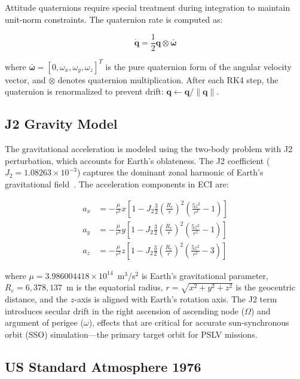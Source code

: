 \documentclass[conference]{IEEEtran}
\newcommand{\vect}[1]{\boldsymbol{#1}}
\begin{document}
Attitude quaternions require special treatment during integration to maintain unit-norm constraints. The quaternion rate is computed as:

\begin{equation}
    \dot{\vect{q}} = \frac{1}{2} \vect{q} \otimes \bar{\vect{\omega}}
    \label{eq:quat_rate}
\end{equation}

\noindent where $\bar{\vect{\omega}} = [0, \omega_x, \omega_y, \omega_z]^T$ is the pure quaternion form of the angular velocity vector, and $\otimes$ denotes quaternion multiplication. After each RK4 step, the quaternion is renormalized to prevent drift: $\vect{q} \leftarrow \vect{q} / \|\vect{q}\|$.

\subsection{J2 Gravity Model}
\label{sec:j2}

The gravitational acceleration is modeled using the two-body problem with J2 perturbation, which accounts for Earth's oblateness. The J2 coefficient ($J_2 = 1.08263 \times 10^{-3}$) captures the dominant zonal harmonic of Earth's gravitational field~\cite{vallado2013fundamentals}. The acceleration components in ECI are:

\begin{align}
    a_x &= -\frac{\mu}{r^3} x \left[1 - J_2 \frac{3}{2}\left(\frac{R_e}{r}\right)^2 \left(\frac{5z^2}{r^2} - 1\right)\right] \label{eq:j2_x} \\
    a_y &= -\frac{\mu}{r^3} y \left[1 - J_2 \frac{3}{2}\left(\frac{R_e}{r}\right)^2 \left(\frac{5z^2}{r^2} - 1\right)\right] \label{eq:j2_y} \\
    a_z &= -\frac{\mu}{r^3} z \left[1 - J_2 \frac{3}{2}\left(\frac{R_e}{r}\right)^2 \left(\frac{5z^2}{r^2} - 3\right)\right] \label{eq:j2_z}
\end{align}

\noindent where $\mu = 3.986004418 \times 10^{14}$~m$^3$/s$^2$ is Earth's gravitational parameter, $R_e = 6{,}378{,}137$~m is the equatorial radius, $r = \sqrt{x^2 + y^2 + z^2}$ is the geocentric distance, and the $z$-axis is aligned with Earth's rotation axis. The J2 term introduces secular drift in the right ascension of ascending node ($\Omega$) and argument of perigee ($\omega$), effects that are critical for accurate sun-synchronous orbit (SSO) simulation---the primary target orbit for PSLV missions.

\subsection{US Standard Atmosphere 1976}
\label{sec:atmo}
\end{document}

